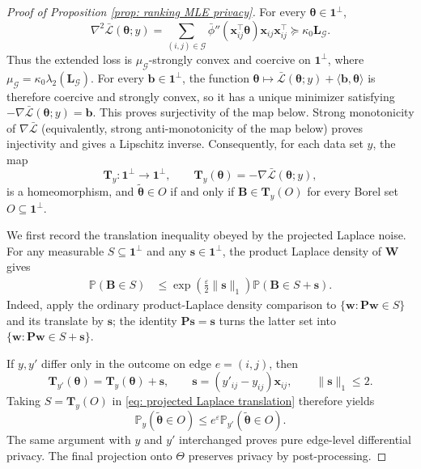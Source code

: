 \documentclass[letterpaper,12pt]{article}
\numberwithin{equation}{section}
\theoremstyle{plain}
\numberwithin{Theorem}{section}
\numberwithin{proposition}{section}
\numberwithin{Lemma}{section}
{
	\theoremstyle{definition}
	\newtheorem{Definition}{Definition}
	\newtheorem{example}{Example}
	\numberwithin{example}{section}
	\newtheorem{fact}{Fact}
	\numberwithin{fact}{section}
	\newtheorem{remark}{Remark}
}
\newcommand{\Pro}{\mathbb{P}}
\newcommand{\1}{\mathbbm{1}}
\def\bth{{\boldsymbol{\theta}}}
\begin{document}
{\begin{proof}[Proof of Proposition \ref{prop: ranking MLE privacy}]
For every $\bth\in\bm1^\perp$,
\[
\nabla^2\bar{\mathcal L}(\bth;y)
=\sum_{(i,j)\in\mathcal G}
\bar\phi''(\bm x_{ij}^\top\bth)
\bm x_{ij}\bm x_{ij}^\top
\succeq\kappa_0\bm L_{\mathcal G}.
\]
Thus the extended loss is
$\mu_{\mathcal G}$-strongly convex and coercive on $\bm1^\perp$, where
$\mu_{\mathcal G}=\kappa_0\lambda_2(\bm L_{\mathcal G})$.
For every $\bm b\in\bm1^\perp$, the function
$\bth\mapsto\bar{\mathcal L}(\bth;y)+\langle\bm b,\bth\rangle$ is therefore coercive and strongly convex, so it has a unique minimizer satisfying
$-\nabla\bar{\mathcal L}(\bth;y)=\bm b$. This proves surjectivity of the map below. Strong monotonicity of $\nabla\bar{\mathcal L}$ (equivalently, strong anti-monotonicity of the map below) proves injectivity and gives a Lipschitz inverse. Consequently, for each data set $y$, the map
\[
\bm T_y:\bm1^\perp\to\bm1^\perp,\qquad
\bm T_y(\bth)=-\nabla\bar{\mathcal L}(\bth;y),
\]
is a homeomorphism, and $\widetilde\bth\in O$ if and only if
$\bm B\in\bm T_y(O)$ for every Borel set $O\subseteq\bm1^\perp$.

We first record the translation inequality obeyed by the projected Laplace noise.
For any measurable $S\subseteq\bm1^\perp$ and any $\bm s\in\bm1^\perp$, the product Laplace density of $\bm W$ gives
\begin{align}\label{eq: projected Laplace translation}
\Pro(\bm B\in S)
&\leq\exp\left(\frac{\varepsilon}{2}\|\bm s\|_1\right)
\Pro(\bm B\in S+\bm s).
\end{align}
Indeed, apply the ordinary product-Laplace density comparison to
$\{\bm w:\bm P\bm w\in S\}$ and its translate by $\bm s$; the identity
$\bm P\bm s=\bm s$ turns the latter set into
$\{\bm w:\bm P\bm w\in S+\bm s\}$.

If $y,y'$ differ only in the outcome on edge $e=(i,j)$, then
\[
\bm T_{y'}(\bth)=\bm T_y(\bth)+\bm s,
\qquad
\bm s=(y'_{ij}-y_{ij})\bm x_{ij},
\qquad
\|\bm s\|_1\leq2.
\]
Taking $S=\bm T_y(O)$ in \eqref{eq: projected Laplace translation} therefore yields
\[
\Pro_y(\widetilde\bth\in O)
\leq e^\varepsilon\Pro_{y'}(\widetilde\bth\in O).
\]
The same argument with $y$ and $y'$ interchanged proves pure
edge-level differential privacy. The final projection onto $\Theta$ preserves privacy by post-processing.
\end{proof}

}
\end{document}
